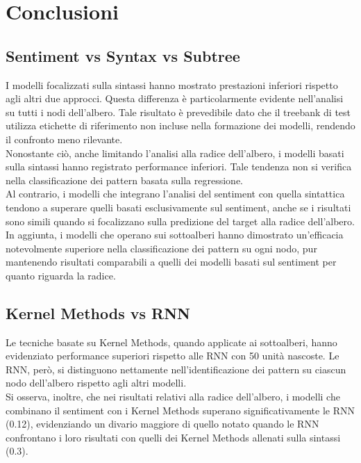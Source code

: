 \section{Conclusioni}

\subsection{Sentiment vs Syntax vs Subtree}

I modelli focalizzati sulla sintassi hanno mostrato prestazioni inferiori 
rispetto agli altri due approcci. Questa differenza è particolarmente evidente 
nell'analisi su tutti i nodi dell'albero. Tale risultato è prevedibile dato 
che il treebank di test utilizza etichette di riferimento non incluse nella 
formazione dei modelli, rendendo il confronto meno rilevante. \\
Nonostante ciò, anche limitando l'analisi alla radice dell'albero, i modelli 
basati sulla sintassi hanno registrato performance inferiori. Tale tendenza non 
si verifica nella classificazione dei pattern basata sulla regressione. \\
Al contrario, i modelli che integrano l'analisi del sentiment con quella
sintattica tendono a superare quelli basati esclusivamente sul sentiment, anche
se i risultati sono simili quando si focalizzano sulla predizione del target
alla radice dell'albero.\\
In aggiunta, i modelli che operano sui sottoalberi hanno dimostrato un'efficacia
notevolmente superiore nella classificazione dei pattern su ogni nodo, pur
mantenendo risultati comparabili a quelli dei modelli basati sul sentiment per
quanto riguarda la radice.

\subsection{Kernel Methods vs RNN}

Le tecniche basate su Kernel Methods, quando applicate ai sottoalberi, hanno
evidenziato performance superiori rispetto alle RNN con 50 unità nascoste. Le
RNN, però, si distinguono nettamente nell'identificazione dei pattern su ciascun
nodo dell'albero rispetto agli altri modelli.\\
Si osserva, inoltre, che nei risultati relativi alla radice dell'albero, i
modelli che combinano il sentiment con i Kernel Methods superano
significativamente le RNN (0.12), evidenziando un divario maggiore di quello 
notato quando le RNN confrontano i loro risultati con quelli dei Kernel Methods
allenati sulla sintassi (0.3).
